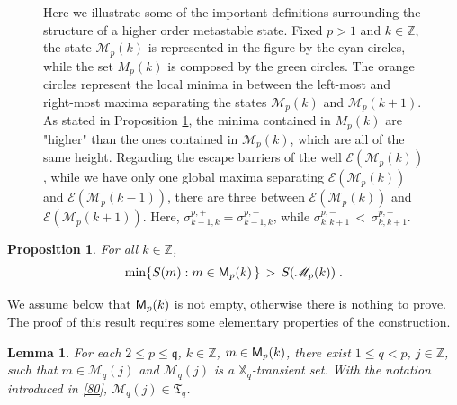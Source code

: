 \documentclass[reqno]{amsart}
\theoremstyle{plain}
\newtheorem{proposition}[theorem]{Proposition}
\newtheorem{lemma}[theorem]{Lemma}
\theoremstyle{definition}
\newcommand{\mf}[1]{{\mathfrak #1}}
\newcommand{\bb}[1]{{\mathbb #1}}
\newcommand{\ms}[1]{{\mathscr #1}}
\newcommand{\mss}[1]{{\textsf #1}}
\newcounter{as}[section]
\newcommand{\<}{\langle}
\renewcommand{\>}{\rangle}
\begin{document}
\begin{figure}
\caption{Here we illustrate some of the important definitions
surrounding the structure of a higher order metastable state. Fixed
$p>1$ and $k\in \bb Z$, the state $\ms M_p(k)$ is represented in the
figure by the cyan circles, while the set $M_p(k)$ is composed by the
green circles. The orange circles represent the local minima in
between the left-most and right-most maxima separating the states
$\ms M_p(k)$ and $\ms M_p(k+1)$. As stated in Proposition \ref{l13},
the minima 
contained in $M_p(k)$ are "higher" than the ones contained in
$\ms M_p(k)$, which are all of the same height. Regarding the escape
barriers of the well $\ms E(\ms M_p(k))$, while we have only one
global maxima separating $\ms E(\ms M_p(k))$ and
$\ms E(\ms M_p(k-1))$, there are three between $\ms E(\ms M_p(k))$ and
$\ms E(\ms M_p(k+1))$. Here,
$\sigma_{k-1,k}^{p,+}=\sigma_{k-1,k}^{p,-}$, while
$\sigma_{k,k+1}^{p,-}\,<\,\sigma_{k,k+1}^{p,+}$.}

\label{fig-f3}
\end{figure}


\begin{proposition}
\label{l13}
For all $k\in \bb Z$,
\begin{equation*}
\min \{ S(m) : m\in \mss M_p(k)\,\} \,>\, S(\ms M_{p}(k))\;.
\end{equation*}
\end{proposition}

We assume below that $\mss M_p(k)$ is not empty, otherwise there is
nothing to prove.  The proof of this result requires some elementary
properties of the construction. 

\begin{lemma}
\label{l16}
For each $2\le p \le \mf q$, $k\in \bb Z$, $m\in \mss M_p(k)$, there
exist $1\le q<p$, $j\in \bb Z$, such that $m \in \ms M_{q} (j)$ and
$\ms M_{q} (j)$ is a $\bb X_q$-transient set. With the notation
introduced in \eqref{80}, $\ms M_{q} (j) \in \mf T_q$.
\end{lemma}
\end{document}
